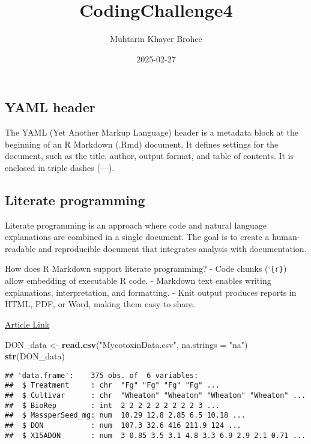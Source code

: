 \documentclass[
]{article}
\title{CodingChallenge4}
\author{Muhtarin Khayer Brohee}
\date{2025-02-27}
\newenvironment{Shaded}{\begin{snugshade}}{\end{snugshade}}
\newcommand{\AttributeTok}[1]{\textcolor[rgb]{0.13,0.29,0.53}{#1}}
\newcommand{\FunctionTok}[1]{\textcolor[rgb]{0.13,0.29,0.53}{\textbf{#1}}}
\newcommand{\NormalTok}[1]{#1}
\newcommand{\OtherTok}[1]{\textcolor[rgb]{0.56,0.35,0.01}{#1}}
\newcommand{\StringTok}[1]{\textcolor[rgb]{0.31,0.60,0.02}{#1}}
\begin{document}
\maketitle

{
\setcounter{tocdepth}{3}
\tableofcontents
}
\subsection{\texorpdfstring{\textbf{YAML
header}}{YAML header}}\label{yaml-header}

The YAML (Yet Another Markup Language) header is a metadata block at the
beginning of an R Markdown (.Rmd) document. It defines settings for the
document, such as the title, author, output format, and table of
contents. It is enclosed in triple dashes (---).

\subsection{\texorpdfstring{\textbf{Literate
programming}}{Literate programming}}\label{literate-programming}

Literate programming is an approach where code and natural language
explanations are combined in a single document. The goal is to create a
human-readable and reproducible document that integrates analysis with
documentation.

How does R Markdown support literate programming? - Code chunks
(`\texttt{\{r\}}) allow embedding of executable R code. - Markdown text
enables writing explanations, interpretation, and formatting. - Knit
output produces reports in HTML, PDF, or Word, making them easy to
share.

\href{https://pubmed.ncbi.nlm.nih.gov/34587775/}{Article Link}

\begin{Shaded}
\begin{Highlighting}[]
\NormalTok{DON\_data }\OtherTok{\textless{}{-}} \FunctionTok{read.csv}\NormalTok{(}\StringTok{"MycotoxinData.csv"}\NormalTok{, }\AttributeTok{na.strings =} \StringTok{"na"}\NormalTok{)}
\FunctionTok{str}\NormalTok{(DON\_data)}
\end{Highlighting}
\end{Shaded}

\begin{verbatim}
## 'data.frame':    375 obs. of  6 variables:
##  $ Treatment     : chr  "Fg" "Fg" "Fg" "Fg" ...
##  $ Cultivar      : chr  "Wheaton" "Wheaton" "Wheaton" "Wheaton" ...
##  $ BioRep        : int  2 2 2 2 2 2 2 2 2 3 ...
##  $ MassperSeed_mg: num  10.29 12.8 2.85 6.5 10.18 ...
##  $ DON           : num  107.3 32.6 416 211.9 124 ...
##  $ X15ADON       : num  3 0.85 3.5 3.1 4.8 3.3 6.9 2.9 2.1 0.71 ...
\end{verbatim}
\end{document}
